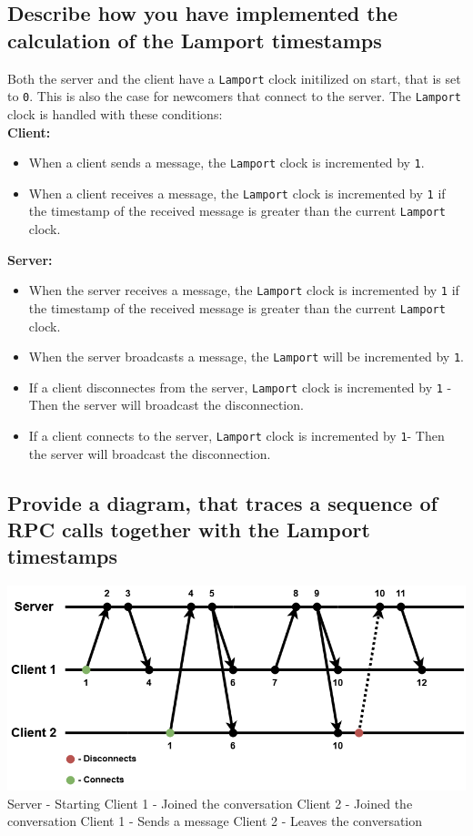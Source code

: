\documentclass[a4paper,11pt]{article}
\begin{document}
\subsection*{Describe how you have implemented the calculation of the Lamport timestamps}
Both the server and the client have a \verb|Lamport| clock initilized on start, that is set to \verb|0|. This is also the case for newcomers that connect to the server. 
The \verb|Lamport| clock is handled with these conditions:\\
\textbf{Client:}
\begin{itemize}
    \item When a client sends a message, the \verb|Lamport| clock is incremented by \verb|1|.
    \item When a client receives a message, the \verb|Lamport| clock is incremented by \verb|1| if the timestamp of the received message is greater than the current \verb|Lamport| clock.
\end{itemize}
\textbf{Server:}
\begin{itemize}
    \item When the server receives a message, the \verb|Lamport| clock is incremented by \verb|1| if the timestamp of the received message is greater than the current \verb|Lamport| clock.
    \item When the server broadcasts a message, the \verb|Lamport| will be incremented by \verb|1|.
    \item If a client disconnectes from the server, \verb|Lamport| clock is incremented by \verb|1| - Then the server will broadcast the disconnection.
    \item If a client connects to the server, \verb|Lamport| clock is incremented by \verb|1|- Then the server will broadcast the disconnection.
\end{itemize}

\subsection*{Provide a diagram, that traces a sequence of RPC calls together with the Lamport timestamps}
\includegraphics[width=\textwidth]{chat.png}
Server   - Starting
Client 1 - Joined the conversation
Client 2 - Joined the conversation
Client 1 - Sends a message
Client 2 - Leaves the conversation
\end{document}
